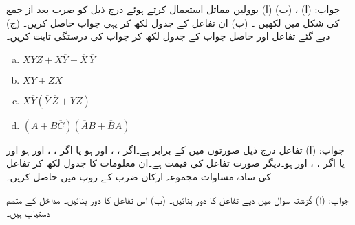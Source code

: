  جواب: (ا) ،   (ب) 
(ا) بوولین مماثل استعمال کرتے ہوئے  درج ذیل کو  ضرب بعد از جمع کی شکل میں لکھیں ۔  (ب) ان تفاعل کے جدول لکھ کر یہی جواب حاصل کریں۔ (ج) دیے گئے تفاعل  اور حاصل جواب کے جدول لکھ کر  جواب کی درستگی ثابت کریں۔
\begin{multicols}{2}
\begin{enumerate}[a.]
\item
 \( XYZ+X\overline{Y}+\overline{X}\,\overline{Y} \)
 \item
 \( XY+\overline{Z}X \)
\item
 \( X\overline{Y}(\overline{Y}\,\overline{Z}+YZ) \)
 \item
 \( (A+B\overline{C})(\overline{A}B+\overline{B}A) \)
  \end{enumerate}
 \end{multicols}
 جواب: (ا) 
 تفاعل  درج ذیل صورتوں میں   کے برابر ہے۔اگر   ،   ، اور   ہو یا اگر   ، ، اور ہو اور یا اگر ، ، اور ہو۔دیگر صورت  تفاعل کی قیمت    ہے۔ان معلومات کا جدول لکھ کر تفاعل کی سادہ  مساوات مجموعہ ارکان ضرب کے روپ میں حاصل کریں۔
 
 جواب: 
(ا) گزشتہ سوال میں دیے  تفاعل  کا   دور  بنائیں۔ (ب) اس تفاعل  کا  دور  بنائیں۔  مداخل کے متمم  دستیاب ہیں۔


